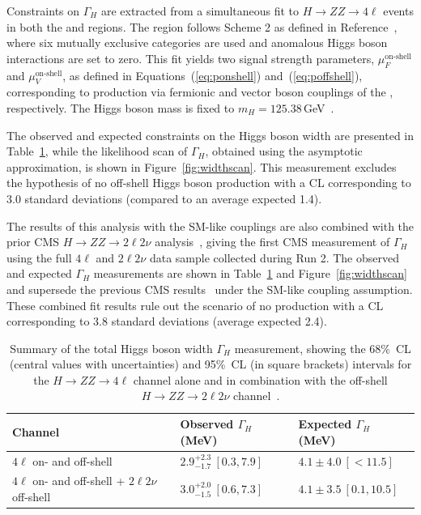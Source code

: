 Constraints on $\Gamma_H$ are extracted from a simultaneous fit to $H \to ZZ \to 4\ell$ events in both the \onshell and \offshell regions. The \onshell region follows Scheme 2 as defined in Reference~\cite{CMS:2021nnc}, where six mutually exclusive categories are used and anomalous Higgs boson interactions are set to zero. This fit yields two signal strength parameters, $\mu^\text{on-shell}_{F}$ and $\mu^\text{on-shell}_{V}$, as defined in Equations~(\ref{eq:ponshell}) and~(\ref{eq:poffshell}), corresponding to production via fermionic and vector boson couplings of the \Hboson, respectively. The Higgs boson mass is fixed to $m_H = 125.38$\,GeV~\cite{Sirunyan:2020xwk}.

The observed and expected constraints on the Higgs boson width are presented in Table~\ref{table:widthoffshellcomb}, while the likelihood scan of $\Gamma_H$, obtained using the asymptotic approximation, is shown in Figure~\ref{fig:widthscan}. This measurement excludes the hypothesis of no off-shell Higgs boson production with a CL corresponding to 3.0 standard deviations (compared to an average expected 1.4).

The results of this analysis with the SM-like couplings are also combined with the prior CMS \offshell $H\to ZZ\to2\ell2\nu$ analysis~\cite{CMS:2022ley}, giving the first CMS measurement of $\Gamma_H$ using the full $4\ell$ and $2\ell2\nu$ data sample collected during Run 2. 
The observed and expected $\Gamma_H$ measurements are shown in Table~\ref{table:widthoffshellcomb} and Figure~\ref{fig:widthscan} and supersede the previous CMS results~\cite{CMS:2022ley} under the SM-like coupling assumption. These combined fit results rule out the scenario of no \offshell \Hboson production
with a CL corresponding to 3.8 standard deviations (average expected 2.4).

\begin{table}[!thb]
    \centering
    \begin{tabular}{lll}
        Channel     & Observed $\Gamma_H$ (MeV)        &  Expected $\Gamma_H$ (MeV)  \\
        \hline
        $4\ell$ on- and off-shell    & $2.9^{+2.3}_{-1.7} \ [0.3,7.9]$ & $4.1\pm 4.0 \ [<11.5 ]$ \\
        $4\ell$ on- and off-shell  + $2\ell2\nu$ off-shell  & $3.0^{+ 2.0 }_{- 1.5 }  \ [0.6, 7.3]$ & $4.1\pm3.5 \ [0.1,10.5]$ \\
    \end{tabular}
    \caption{Summary of the total Higgs boson width $\Gamma_H$ measurement, showing the 68\%~CL (central values with uncertainties)
    and 95\%~CL (in square brackets) intervals for the $H \to ZZ \to 4 \ell$ channel alone and in combination with the off-shell $H \to ZZ \to 2 \ell 2 \nu$ channel~\cite{PhysRevD.111.092014}.}
    \label{table:widthoffshellcomb}
\end{table}


